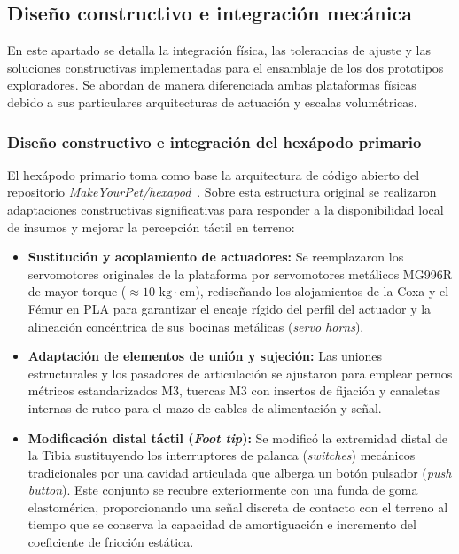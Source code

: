 \subsection{Diseño constructivo e integración mecánica}

\hspace{1.25cm}
En este apartado se detalla la integración física, las tolerancias de ajuste y las soluciones constructivas implementadas para el ensamblaje de los dos prototipos exploradores. Se abordan de manera diferenciada ambas plataformas físicas debido a sus particulares arquitecturas de actuación y escalas volumétricas.

\subsubsection{Diseño constructivo e integración del hexápodo primario}

\hspace{1.25cm}
El hexápodo primario toma como base la arquitectura de código abierto del repositorio \textit{MakeYourPet/hexapod}~\cite{MakeYourPetHexapod}. Sobre esta estructura original se realizaron adaptaciones constructivas significativas para responder a la disponibilidad local de insumos y mejorar la percepción táctil en terreno:

\begin{itemize}
    \item \textbf{Sustitución y acoplamiento de actuadores:} Se reemplazaron los servomotores originales de la plataforma por servomotores metálicos MG996R de mayor torque ($\approx 10\text{ kg}\cdot\text{cm}$), rediseñando los alojamientos de la Coxa y el Fémur en PLA para garantizar el encaje rígido del perfil del actuador y la alineación concéntrica de sus bocinas metálicas (\textit{servo horns}).
    \item \textbf{Adaptación de elementos de unión y sujeción:} Las uniones estructurales y los pasadores de articulación se ajustaron para emplear pernos métricos estandarizados M3, tuercas M3 con insertos de fijación y canaletas internas de ruteo para el mazo de cables de alimentación y señal.
    \item \textbf{Modificación distal táctil (\textit{Foot tip}):} Se modificó la extremidad distal de la Tibia sustituyendo los interruptores de palanca (\textit{switches}) mecánicos tradicionales por una cavidad articulada que alberga un botón pulsador (\textit{push button}). Este conjunto se recubre exteriormente con una funda de goma elastomérica, proporcionando una señal discreta de contacto con el terreno al tiempo que se conserva la capacidad de amortiguación e incremento del coeficiente de fricción estática.
\end{itemize}

